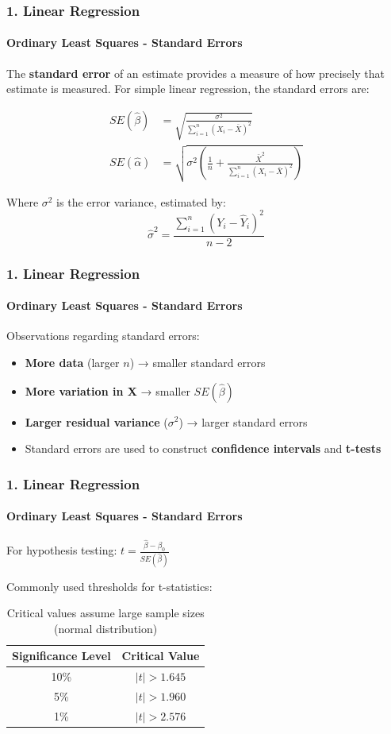 \documentclass{beamer}
\begin{document}
\begin{foundframe}[t]
    \frametitle{1. Linear Regression}
    \framesubtitle{Ordinary Least Squares - Standard Errors}

    The \textbf{standard error} of an estimate provides a measure of how precisely that estimate is measured. For simple linear regression, the standard errors are:

    \begin{align*}
    SE(\hat{\beta}) &= \sqrt{\frac{\sigma^2}{\sum_{i=1}^n (X_i - \bar{X})^2}}\\[0.5em]
    SE(\hat{\alpha}) &= \sqrt{\sigma^2 \left(\frac{1}{n} + \frac{\bar{X}^2}{\sum_{i=1}^n (X_i - \bar{X})^2}\right)}
    \end{align*}

    Where $\sigma^2$ is the error variance, estimated by:
    $$\hat{\sigma}^2 = \frac{\sum_{i=1}^n (Y_i - \hat{Y}_i)^2}{n-2}$$

\end{foundframe}

\begin{foundframe}[t]
    \frametitle{1. Linear Regression}
    \framesubtitle{Ordinary Least Squares - Standard Errors}

    Observations regarding standard errors:

    \begin{itemize}
        \item \textbf{More data} (larger $n$) → smaller standard errors
        \item \textbf{More variation in X} → smaller $SE(\hat{\beta})$
        \item \textbf{Larger residual variance} ($\sigma^2$) → larger standard errors
        \item Standard errors are used to construct \textbf{confidence intervals} and \textbf{t-tests}
    \end{itemize}

\end{foundframe}

\begin{foundframe}[t]
    \frametitle{1. Linear Regression}
    \framesubtitle{Ordinary Least Squares - Standard Errors}

    For hypothesis testing: $t = \frac{\hat{\beta} - \beta_0}{SE(\hat{\beta})}$

    \vspace{1em}
    Commonly used thresholds for t-statistics:

    \begin{table}
    \centering
    \begin{tabular}{cc}
    \toprule
    Significance Level & Critical Value  \\
    \midrule
    10\% & $|t| > 1.645$  \\
    5\% & $|t| > 1.960$  \\
    1\% & $|t| > 2.576$ \\
    \bottomrule
    \end{tabular}
    \caption{Critical values assume large sample sizes (normal distribution)}
    \end{table}

\end{foundframe}
\end{document}
